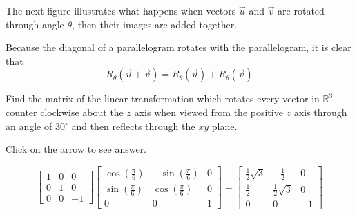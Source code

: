 \documentclass{ximera}
\begin{document}
\begin{problem}
\begin{hint}
The next figure  illustrates what happens when vectors $\vec{u}$ and $\vec{v}$ are rotated through angle $\theta$, then their images are added together.  

\begin{center}
  \end{center}
  
  
  Because the diagonal of a parallelogram rotates with the parallelogram, it is clear that 
$$R_{\theta}(\vec{u}+\vec{v})=R_{\theta}(\vec{u})+R_{\theta}(\vec{v})$$
\end{hint}
\end{problem}

\begin{problem}\label{prb:6.25} Find the matrix of the linear transformation which rotates every
vector in $\mathbb{R}^{3}$ counter clockwise about the $z$ axis when viewed
from the positive $z$ axis through an angle of 30$^{\circ }$ and then
reflects through the $xy$ plane.

Click on the arrow to see answer.
\begin{expandable}
\[
\left[
\begin{array}{rrr}
1 & 0 & 0 \\
0 & 1 & 0 \\
0 & 0 & -1
\end{array}
\right] \left[
\begin{array}{ccc}
\cos \left( \frac{\pi }{6}\right)  & -\sin \left( \frac{\pi }{6}\right)  & 0
\\
\sin \left( \frac{\pi }{6}\right)  & \cos \left( \frac{\pi }{6}\right)  & 0
\\
0 & 0 & 1
\end{array}
\right] = \left[
\begin{array}{ccc}
\frac{1}{2}\sqrt{3} & -\frac{1}{2} & 0 \\
\frac{1}{2} & \frac{1}{2}\sqrt{3} & 0 \\
0 & 0 & -1
\end{array}
\right]
\]
\end{expandable}
\end{problem}
\end{document}
